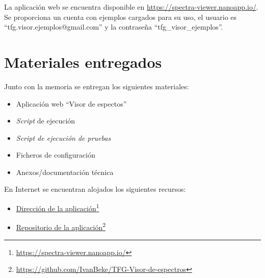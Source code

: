 La aplicación web se encuentra disponible en
\url{https://spectra-viewer.nanoapp.io/}. Se proporciona un cuenta con ejemplos
cargados para su uso, el usuario es ``tfg.visor.ejemplos@gmail.com'' y la
contraseña ``tfg\_visor\_ejemplos''.

\section{Materiales entregados}

Junto con la memoria se entregan los siguientes materiales:
\begin{itemize}
	\tightlist	
	\item Aplicación web ``Visor de espectos''
	\item \textit{Script} de ejecución
	\item \textit{Script de ejecución de pruebas}
	\item Ficheros de configuración
	\item Anexos/documentación técnica
\end{itemize}
En Internet se encuentran alojados los siguientes recursos:
\begin{itemize}
	\tightlist	
	\item \href{https://spectra-viewer.nanoapp.io/}{Dirección de la
		aplicación}\footnote{\url{https://spectra-viewer.nanoapp.io/}}
	\item \href{https://github.com/IvanBeke/TFG-Visor-de-espectros}{Repositorio de
		la
		aplicación}\footnote{\url{https://github.com/IvanBeke/TFG-Visor-de-espectros}}
\end{itemize}
